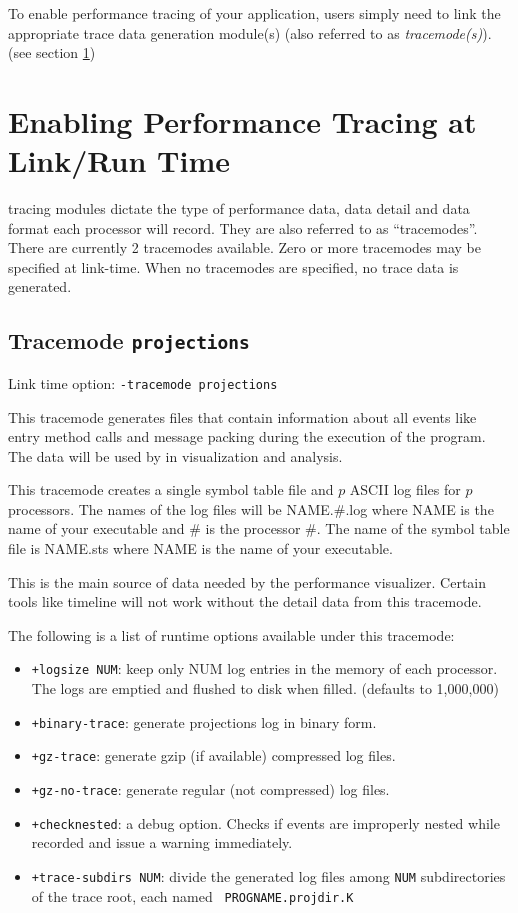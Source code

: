 To enable performance tracing of your application, users simply need
to link the appropriate trace data generation module(s) (also referred
to as {\em tracemode(s)}). (see section \ref{sec::trace modules})

\section{Enabling Performance Tracing at Link/Run Time}
\label{sec::trace modules}

\projections{} tracing modules dictate the type of performance data,
data detail and data format each processor will record. They are also
referred to as ``tracemodes''. There are currently 2 tracemodes
available. Zero or more tracemodes may be specified at link-time. When
no tracemodes are specified, no trace data is generated.

\subsection{Tracemode {\tt projections}}
\label{sec::trace module projections}

Link time option: {\tt -tracemode projections}

This tracemode generates files that contain
information about all \charmpp{} events like entry method calls and
message packing during the execution of the program.  The data will be
used by \projections{} in visualization and analysis.

This tracemode creates a single symbol table file and $p$ ASCII
log files for $p$ processors. The names of the log files will be
NAME.\#.log where NAME is the name of your executable and \# is the
processor \#. The name of the symbol table file is NAME.sts where NAME
is the name of your executable.

This is the main source of data needed by the performance
visualizer. Certain tools like timeline will not work without the
detail data from this tracemode.

The following is a list of runtime options available under this tracemode:

\begin{itemize}
\item
{\tt +logsize NUM}: keep only NUM log entries in the memory of each
processor. The logs are emptied and flushed to disk when
filled. (defaults to 1,000,000)
\item
{\tt +binary-trace}:  generate projections log in binary form.
\item
{\tt +gz-trace}:      generate gzip (if available) compressed log files.
\item
{\tt +gz-no-trace}:      generate regular (not compressed) log files.
\item
{\tt +checknested}: a debug option. Checks if events are improperly nested
while recorded and issue a warning immediately.

\item {\tt +trace-subdirs NUM}: divide the generated log files among
  {\tt NUM} subdirectories of the trace root, each named {\tt
    PROGNAME.projdir.K}
\end{itemize}

